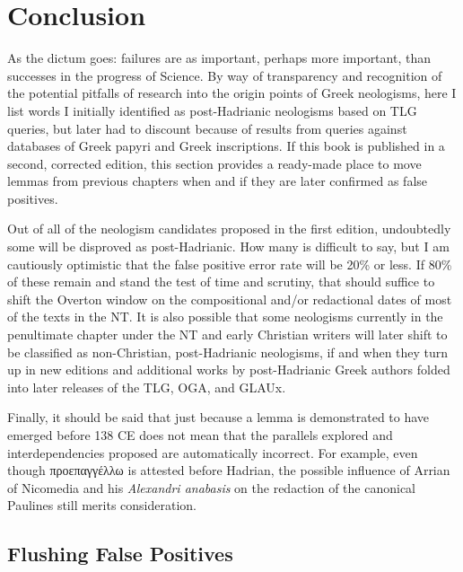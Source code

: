 %
%
\chapter{Conclusion}%
%
\vspace*{3mm}
%
\justifying

\noindent{}As the dictum goes: failures are as important, perhaps more important, %
than successes in the progress of Science. %
By way of transparency and recognition of the potential pitfalls of research into the origin points of Greek neologisms, %
here I list words I initially identified as post-Hadrianic neologisms based on TLG queries, %
but later had to discount because of results from queries against databases of Greek papyri and Greek inscriptions. %
If this book is published in a second, corrected edition, %
this section provides a ready-made place to move lemmas from previous chapters %
when and if they are later confirmed as false positives. %

Out of all of the neologism candidates proposed in the first edition, 
undoubtedly some will be disproved as post-Hadrianic. %
How many is difficult to say, but I am cautiously optimistic that the false positive error rate will be 20\% or less. %
If 80\% of these remain and stand the test of time and scrutiny, that should suffice to shift the Overton window %
on the compositional and/or redactional dates of most of the texts in the NT. %
It is also possible that some neologisms currently in the penultimate chapter under %
the NT and early Christian writers will later shift to be classified as non-Christian, post-Hadrianic %
neologisms, if and when they turn up in new editions and additional works by post-Hadrianic Greek authors %
folded into later releases of the TLG, OGA, and GLAUx. %

Finally, it should be said that just because a lemma is demonstrated %
to have emerged before 138 CE does not mean that %
the parallels explored and interdependencies proposed are automatically incorrect. %
For example, even though προεπαγγέλλω is attested before Hadrian, %
the possible influence of Arrian of Nicomedia and his \textit{Alexandri anabasis} %
on the redaction of the canonical Paulines still merits consideration. \clearpage

\section{Flushing False Positives}

